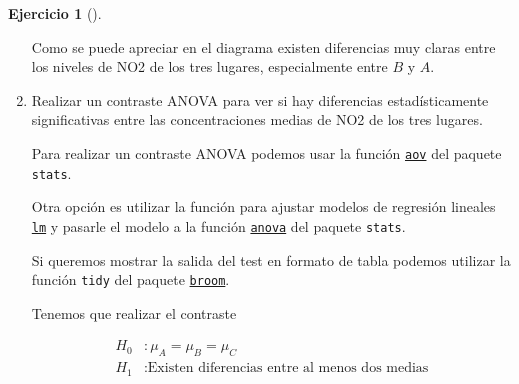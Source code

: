 \documentclass[
  a4paper,
]{scrreport}
\theoremstyle{definition}
\newtheorem{exercise}{Ejercicio}[chapter]
\theoremstyle{remark}
\begin{document}
\begin{exercise}[]
\begin{enumerate}
\begin{tcolorbox}
\begin{figure}[H]
  \end{figure}

  Como se puede apreciar en el diagrama existen diferencias muy claras
  entre los niveles de NO2 de los tres lugares, especialmente entre
  \(B\) y \(A\).

  \end{tcolorbox}
\item
  Realizar un contraste ANOVA para ver si hay diferencias
  estadísticamente significativas entre las concentraciones medias de
  NO2 de los tres lugares.

  \begin{tcolorbox}[enhanced jigsaw, coltitle=black, left=2mm, colback=white, leftrule=.75mm, toptitle=1mm, breakable, bottomrule=.15mm, titlerule=0mm, bottomtitle=1mm, title=\textcolor{quarto-callout-note-color}{\faInfo}\hspace{0.5em}{Ayuda}, arc=.35mm, toprule=.15mm, rightrule=.15mm, colframe=quarto-callout-note-color-frame, opacityback=0, colbacktitle=quarto-callout-note-color!10!white, opacitybacktitle=0.6]

  Para realizar un contraste ANOVA podemos usar la función
  \href{https://rdrr.io/r/stats/aov.html}{\texttt{aov}} del paquete
  \texttt{stats}.

  Otra opción es utilizar la función para ajustar modelos de regresión
  lineales
  \href{https://www.rdocumentation.org/packages/stats/versions/3.6.2/topics/lm}{\texttt{lm}}
  y pasarle el modelo a la función
  \href{https://rdrr.io/r/stats/anova.html}{\texttt{anova}} del paquete
  \texttt{stats}.

  Si queremos mostrar la salida del test en formato de tabla podemos
  utilizar la función \texttt{tidy} del paquete
  \href{https://broom.tidymodels.org/index.html}{\texttt{broom}}.

  \end{tcolorbox}

  \begin{tcolorbox}[enhanced jigsaw, coltitle=black, left=2mm, colback=white, leftrule=.75mm, toptitle=1mm, breakable, bottomrule=.15mm, titlerule=0mm, bottomtitle=1mm, title=\textcolor{quarto-callout-tip-color}{\faLightbulb}\hspace{0.5em}{Solución}, arc=.35mm, toprule=.15mm, rightrule=.15mm, colframe=quarto-callout-tip-color-frame, opacityback=0, colbacktitle=quarto-callout-tip-color!10!white, opacitybacktitle=0.6]

  Tenemos que realizar el contraste

  \begin{align*}
  H_0 &: \mu_A = \mu_B = \mu_C \\
  H_1 &: \mbox{Existen diferencias entre al menos dos medias}
  \end{align*}


\end{tcolorbox}
\end{enumerate}
\end{exercise}
\end{document}
